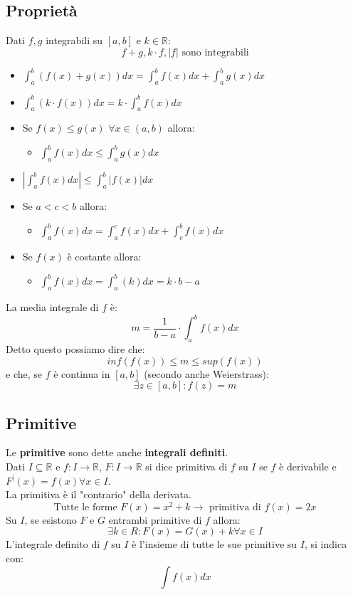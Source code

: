 \documentclass[12pt,a4paper]{article}
\begin{document}
\subsection{Proprietà}
Dati $f,g$ integrabili su $[a,b]$ e $k \in \mathbb{R}$:
\[
  f+g, k \cdot f, |f| \text{ sono integrabili}
\]
\begin{itemize}
  \item $\int_{a}^{b} (f(x) + g(x)) dx = \int_{a}^{b} f(x) dx + \int_{a}^{b} g(x) dx$
  \item $\int_{a}^{b} (k \cdot f(x)) dx = k \cdot \int_{a}^{b} f(x) dx$
  \item Se $f(x) \leq g(x)$ $\forall x \in (a,b)$ allora:
  \begin{itemize}
    \item $\int_{a}^{b} f(x) dx \leq \int_{a}^{b} g(x) dx$
  \end{itemize}
  \item $|\int_{a}^{b} f(x) dx| \leq \int_{a}^{b} |f(x)| dx$
  \item Se $a < c < b$ allora:
  \begin{itemize}
    \item $\int_{a}^{b} f(x) dx = \int_{a}^{c} f(x) dx + \int_{c}^{b} f(x) dx$ 
  \end{itemize}
  \item Se $f(x)$ è costante allora:
  \begin{itemize}
    \item $\int_{a}^{b} f(x) dx = \int_{a}^{b} (k) dx = k \cdot b-a$
  \end{itemize}
\end{itemize}
La media integrale di $f$ è:
\[
m = \frac{1}{b-a} \cdot \int_{a}^{b} f(x) dx
\]
Detto questo possiamo dire che:
\[
inf(f(x)) \leq m \leq sup(f(x))
\]
e che, se $f$ è continua in $[a,b]$ (secondo anche Weierstrass):
\[
\exists z \in [a,b] : f(z) = m
\]

\subsection{Primitive}
Le \textbf{primitive} sono dette anche \textbf{integrali definiti}.\\
Dati $I \subseteq \mathbb{R}$ e $f:I \rightarrow \mathbb{R}$, $F:I \rightarrow \mathbb{R}$ si dice primitiva di $f$ su $I$ se $f$ è derivabile e $F^|(x) = f(x) \forall x \in I$.\\
La primitiva è il "contrario" della derivata.\\
\[
\text{Tutte le forme } F(x) = x^2 + k \rightarrow \text{ primitiva di } f(x) = 2x
\]
Su $I$, se esistono $F$ e $G$ entrambi primitive di $f$ allora:
\[
\exists k \in R : F(x) = G(x) + k \forall x \in I
\]
L'integrale definito di $f$ su $I$ è l'insieme di tutte le sue primitive su $I$, si indica con:
\[
\int f(x) dx
\]
\end{document}
